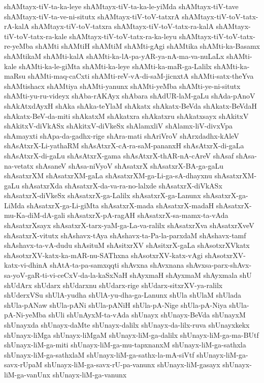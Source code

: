 {shAMtayx-tiV-ta-ka-leye
shAMtayx-tiV-ta-ka-le-yiMda
shAMtayx-tiV-tave
shAMtayx-tiV-ta-ve-ni-situtx
shAMtayx-tiV-toV-tatxrA
shAMtayx-tiV-toV-tatx-rA-kalA
shAMtayx-tiV-toV-tatxra
shAMtayx-tiV-toV-tatx-ra-kalA
shAMtayx-tiV-toV-tatx-ra-kale
shAMtayx-tiV-toV-tatx-ra-ka-leyu
shAMtayx-tiV-toV-tatx-re-yeMba
shAMti
shAMtiH
shAMtiM
shAMti-gAgi
shAMtika
shAMti-ka-Basamx
shAMtikaM
shAMti-kalA
shAMti-ka-lA-pa-yAR-ya-nA-ma-va-nuLaLx
shAMti-kale
shAMti-ka-le-giMta
shAMti-ka-leye
shAMti-ka-maR-ga-Lalilx
shAMti-ka-maRsu
shAMti-maq-caCxti
shAMti-reV-vA-di-saM-jicnxtA
shAMti-satx-theYva
shAMtishacx
shAMtiya
shAMti-yanunx
shAMti-yeMba
shAMti-ye-ni-situtx
shAMti-yu-ru-videyx
shAba-rAKAyx
shAbara
shAdUR-laM-gaLu
shAda-pAnoV
shAkAtxdAyxH
shAka
shAka-teYlaM
shAkatx
shAkatx-BeVda
shAkatx-BeVdaH
shAkatx-BeV-da-miti
shAkatxM
shAkatxra
shAkatxru
shAkatxsayx
shAkitxV
shAkitxV-diVkASx
shAkitxV-diVkeSx
shAlamxliV
shAlamx-liV-divxVpa
shAmayxti
shApa-da-gadhx-rige
shAra-mati
shAriVroV
shArxdadhx-kAleV
shAsAtxrX-Li-yathaRM
shAsAtxrX-cA-ra-saM-pananxH
shAsAtxrX-di-gaLa
shAsAtxrX-di-gaLu
shAsAtxrX-gama
shAsAtxrX-thAR-nA-cAreV
shAsaf
shAsa-na-vetatx
shAsaneV
shAsa-niVyoV
shAsatxrX
shAsatxrX-BA-ga-gaLu
shAsatxrXM
shAsatxrXM-gaLa
shAsatxrXM-ga-Li-ga-sA-dhayxnu
shAsatxrXM-gaLu
shAsatxrXda
shAsatxrX-da-va-ra-no-lalxde
shAsatxrX-diVkASx
shAsatxrX-diVkeSx
shAsatxrX-ga-Lalilx
shAsatxrX-ga-Lanunx
shAsatxrX-ga-LiMda
shAsatxrX-ga-Li-giMta
shAsatxrX-mada
shAsatxrX-madaH
shAsatxrX-mu-Ka-diM-dA-gali
shAsatxrX-pA-ragAH
shAsatxrX-sa-mamx-ta-vAda
shAsatxrXsayx
shAsatxrX-tarx-yaM-ga-La-va-ralilx
shAsatxrXva
shAsatxrXveV
shAsatxrX-vitutx
shAshavx-tAya
shAshavx-ta-Pa-la-parxdaM
shAshavx-tamf
shAshavx-ta-vA-dudu
shAsituM
shAsitxrXV
shAsitxrX-gaLa
shAsotxrXVkatx
shAsotxrXV-katx-ka-mAR-nu-SAThxna
shAsotxrXV-katx-vAgi
shAsotxrXV-katx-vi-dhinA
shAtA-ta-pa-samxqqti
shAvxna
shAvxnana
shAvxsa-parx-shAvx-sa-yoV-gaR-ti-vi-ceCxV-da-la-kaSxNaH
shAyxmaH
shAyxmaM
shAyxmala
shU
shUdArx
shUdarx
shUdarxnu
shUdarx-rige
shUdarx-sitxrXV-ya-ralilx
shUderxVSu
shUlA-yudha
shUlA-yu-dha-ga-Lanunx
shUla
shUlaM
shUlada
shUla-pANaw
shUla-pANi
shUla-pANiH
shUla-pA-Nige
shUla-pA-Niya
shUla-pA-Ni-yeMba
shUli
shUnAyxM-ta-vAda
shUnayx
shUnayx-BeVda
shUnayxM
shUnayxda
shUnayx-daMte
shUnayx-dalilx
shUnayx-da-lilx-ruva
shUnayxkekx
shUnayx-liMga
shUnayx-liMgaM
shUnayx-liM-ga-dalilx
shUnayx-liM-ga-ma-BUtf
shUnayx-liM-ga-miti
shUnayx-liM-ga-mu-tapxnanxM
shUnayx-liM-ga-sathxla
shUnayx-liM-ga-sathxlaM
shUnayx-liM-ga-sathx-la-mA-siVtf
shUnayx-liM-ga-savx-rUpaM
shUnayx-liM-ga-savx-rU-pa-vanunx
shUnayx-liM-gasayx
shUnayx-liM-ga-vanUnx
shUnayx-liM-ga-vanunx
}
